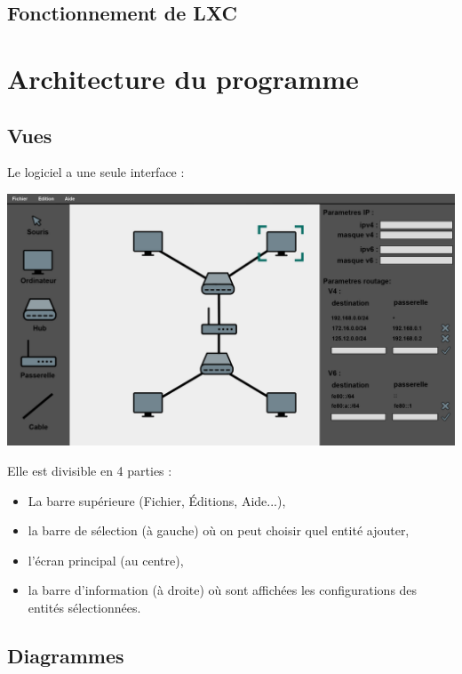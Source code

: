 \documentclass[a4paper]{article}
\begin{document}
\subsection{Fonctionnement de LXC}

\newpage
\section{Architecture du programme}
\subsection{Vues}
Le logiciel a une seule interface : 
\begin{center}
\includegraphics[scale=0.2]{bulto.png}
\end{center}

Elle est divisible en 4 parties : 
\begin{itemize}
\item La barre supérieure (Fichier, Éditions, Aide...),
\item la barre de sélection (à gauche) où on peut choisir quel entité ajouter,
\item l'écran principal (au centre),
\item la barre d'information (à droite) où sont affichées les configurations des entités sélectionnées.
\end{itemize}

\newpage
\subsection{Diagrammes}
\end{document}
